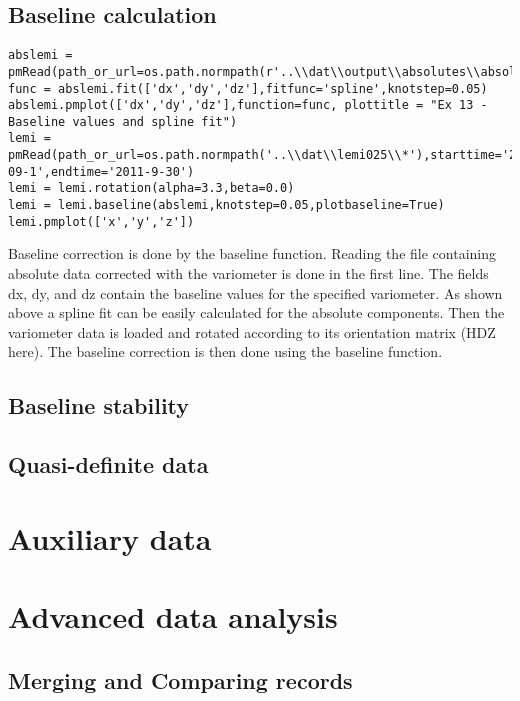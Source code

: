 \subsection{Baseline calculation}
\begin{verbatim}
abslemi = pmRead(path_or_url=os.path.normpath(r'..\\dat\\output\\absolutes\\absolutes_lemi.txt'))
func = abslemi.fit(['dx','dy','dz'],fitfunc='spline',knotstep=0.05)
abslemi.pmplot(['dx','dy','dz'],function=func, plottitle = "Ex 13 - Baseline values and spline fit")
lemi = pmRead(path_or_url=os.path.normpath('..\\dat\\lemi025\\*'),starttime='2011-09-1',endtime='2011-9-30')
lemi = lemi.rotation(alpha=3.3,beta=0.0)
lemi = lemi.baseline(abslemi,knotstep=0.05,plotbaseline=True)
lemi.pmplot(['x','y','z'])
\end{verbatim}

Baseline correction is done by the baseline function. Reading the file containing absolute data corrected with the variometer is done in the first line. The fields dx, dy, and dz contain the baseline values for the specified variometer. As shown above a spline fit can be easily calculated for the absolute components. Then the variometer data is loaded and rotated according to its orientation matrix (HDZ here). The baseline correction is then done using the baseline function.


\subsection{Baseline stability}


\subsection{Quasi-definite data}


\section{Auxiliary data}


\section{Advanced data analysis}

\subsection{Merging and Comparing records}

